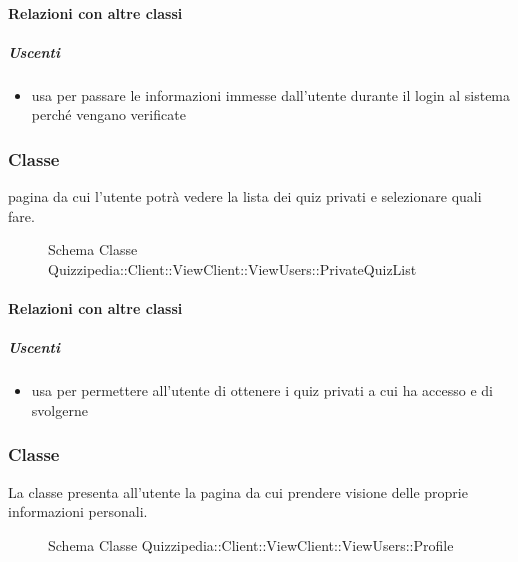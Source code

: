 \paragraph{Relazioni con altre classi}
\subparagraph{Uscenti}
\begin{itemize}
\item usa  per passare le informazioni immesse dall'utente durante il login al sistema perché vengano verificate
\end{itemize}
\subsubsection{Classe }
pagina da cui l'utente potrà vedere la lista dei quiz privati e selezionare quali fare.
\begin{figure}[H]
\centering
\noindent{}
\caption[Schema Classe PrivateQuizList]{Schema Classe Quizzipedia::Client::ViewClient::ViewUsers::PrivateQuizList}
\end{figure}
\paragraph{Relazioni con altre classi}
\subparagraph{Uscenti}
\begin{itemize}
\item usa  per permettere all'utente di ottenere i quiz privati a cui ha accesso e di svolgerne
\end{itemize}
\subsubsection{Classe }
La classe presenta all'utente la pagina da cui prendere visione delle proprie informazioni personali.
\begin{figure}[H]
\centering
\noindent{}
\caption[Schema Classe Profile]{Schema Classe Quizzipedia::Client::ViewClient::ViewUsers::Profile}
\end{figure}
